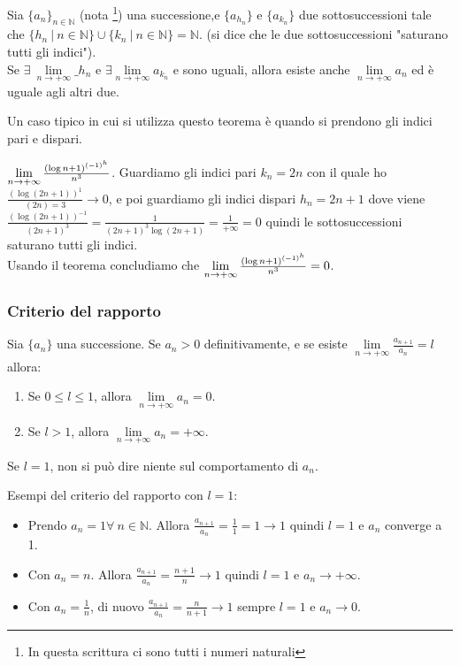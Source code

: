 \begin{theorem}
Sia $\{a_n\}_{n \in \mathbb{N}}$ (nota \footnote{In questa scrittura ci sono tutti i numeri naturali}) una successione,e $\{a_{h_n}\}$ e $\{a_{k_n}\}$ due sottosuccessioni tale che $\{h_n \: | \: n \in \mathbb{N}\} \cup \{k_n \: | \: n \in \mathbb{N}\} = \mathbb{N}$. (si dice che le due sottosuccessioni "saturano tutti gli indici").\\
Se $\exists \: \lim\limits_{n\to +\infty}\_{h_n}$ e $\exists \lim\limits_{n\to +\infty}a_{k_n}$ e sono uguali, allora esiste anche $\lim\limits_{n\to +\infty}a_n$ ed è uguale agli altri due.
\end{theorem}
\hspace{-15pt}Un caso tipico in cui si utilizza questo teorema è quando si prendono gli indici pari e dispari.
\begin{example}
$\Large{\lim\limits_{n\to +\infty}\frac{(\log{n+1})^{(-1)^h}}{n^3}}$. Guardiamo gli indici pari $k_n = 2n$ con il quale ho $\frac{(\log(2n+1))^1}{(2n)=3} \to 0$, e poi guardiamo gli indici dispari $h_n = 2n+1$ dove viene $\frac{(\log(2n+1))^{-1}}{(2n+1)^3} = \frac{1}{(2n+1)^3\log(2n+1)} = \frac{1}{+\infty} = 0$ quindi le sottosuccessioni saturano tutti gli indici.\\
Usando il teorema concludiamo che $\Large{\lim\limits_{n\to +\infty}\frac{(\log{n+1})^{(-1)^h}}{n^3}} = 0$.
\end{example}

\subsubsection{Criterio del rapporto}
\begin{theorem}
Sia $\{a_n\}$ una successione.  Se $a_n > 0$ definitivamente, e se esiste $\lim\limits_{n\to +\infty}\frac{a_{n+1}}{a_n} = l$ allora:
\begin{enumerate}
    \item Se $0 \leq l \leq 1$, allora $\lim\limits_{n\to +\infty} a_n = 0$.
    \item Se $l > 1$, allora $\lim\limits_{n\to +\infty}a_n = +\infty$.
\end{enumerate}
\end{theorem}

\begin{observation}
Se $l = 1$, non si può dire niente sul comportamento di $a_n$.
\end{observation}

\begin{example}
Esempi del criterio del rapporto con $l=1$:
\begin{itemize}
    \item Prendo $a_n = 1 \forall \: n \in \mathbb{N}$. Allora $\frac{a_{n+1}}{a_n} = \frac{1}{1} = 1 \to 1$ quindi $l=1$ e $a_n$ converge a 1.
    \item Con $a_n = n$. Allora $\frac{a_{n+1}}{a_n} = \frac{n+1}{n} \to 1$ quindi $l=1$ e $a_n \to +\infty$.
    \item Con $a_n = \frac{1}{n}$, di nuovo $\frac{a_{n+1}}{a_n} = \frac{n}{n+1} \to 1$ sempre $l=1$ e $a_n \to 0$.
\end{itemize}
\end{example}

